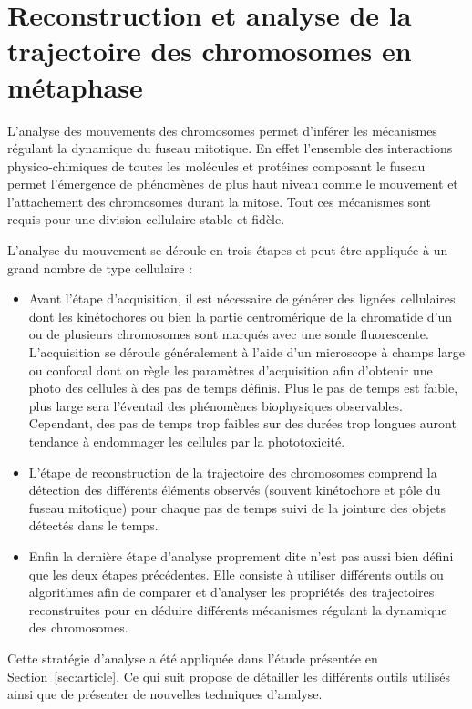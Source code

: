 \documentclass[12pt,a4paper,twoside,openright]{book}
\begin{document}
\section{Reconstruction et analyse de la trajectoire des chromosomes en
métaphase}\label{reconstruction-et-analyse-de-la-trajectoire-des-chromosomes-en-muxe9taphase}

L'analyse des mouvements des chromosomes permet d'inférer les mécanismes
régulant la dynamique du fuseau mitotique. En effet l'ensemble des
interactions physico-chimiques de toutes les molécules et protéines
composant le fuseau permet l'émergence de phénomènes de plus haut niveau
comme le mouvement et l'attachement des chromosomes durant la mitose.
Tout ces mécanismes sont requis pour une division cellulaire stable et
fidèle.

L'analyse du mouvement se déroule en trois étapes et peut être appliquée
à un grand nombre de type cellulaire :

\begin{itemize}
\item
  Avant l'étape d'acquisition, il est nécessaire de générer des lignées
  cellulaires dont les kinétochores ou bien la partie centromérique de
  la chromatide d'un ou de plusieurs chromosomes sont marqués avec une
  sonde fluorescente. L'acquisition se déroule généralement à l'aide
  d'un microscope à champs large ou confocal dont on règle les
  paramètres d'acquisition afin d'obtenir une photo des cellules à des
  pas de temps définis. Plus le pas de temps est faible, plus large sera
  l'éventail des phénomènes biophysiques observables. Cependant, des pas
  de temps trop faibles sur des durées trop longues auront tendance à
  endommager les cellules par la phototoxicité.
\item
  L'étape de reconstruction de la trajectoire des chromosomes comprend
  la détection des différents éléments observés (souvent kinétochore et
  pôle du fuseau mitotique) pour chaque pas de temps suivi de la
  jointure des objets détectés dans le temps.
\item
  Enfin la dernière étape d'analyse proprement dite n'est pas aussi bien
  défini que les deux étapes précédentes. Elle consiste à utiliser
  différents outils ou algorithmes afin de comparer et d'analyser les
  propriétés des trajectoires reconstruites pour en déduire différents
  mécanismes régulant la dynamique des chromosomes.
\end{itemize}

Cette stratégie d'analyse a été appliquée dans l'étude présentée en
Section~\ref{sec:article}. Ce qui suit propose de détailler les
différents outils utilisés ainsi que de présenter de nouvelles
techniques d'analyse.
\end{document}
